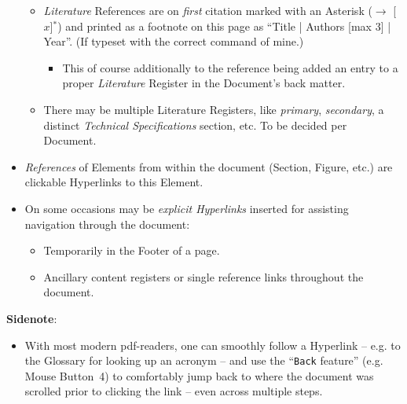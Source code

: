 \begin{itemize}
\begin{itemize}
    \item
        \textit{Literature} References are on \textit{first} citation marked with an Asterisk ($\rightarrow$ [$x$]$^\ast$) and printed as a footnote on this page as \enquote{Title | Authors [max 3] | Year}. (If typeset with the correct command of mine.)
        \begin{itemize}
        \item
            This of course additionally to the reference being added an entry to a proper \textit{Literature} Register in the Document's back matter.
        \end{itemize}
    \item
        There may be multiple Literature Registers, like \textit{primary}, \textit{secondary}, a distinct \textit{Technical Specifications} section, etc. To be decided per Document.
    \end{itemize}
\item
    \textit{References} of Elements from within the document (Section, Figure, etc.) are clickable Hyperlinks to this Element.
\item
    On some occasions may be \textit{explicit Hyperlinks} inserted for assisting navigation through the document:
    \begin{itemize}
    \item
        Temporarily in the Footer of a page.
    \item
        Ancillary content registers or single reference links throughout the document.
    \end{itemize}
\end{itemize}

\npi%
\textbf{Sidenote}:
\begin{itemize}
\item
    With most modern pdf-readers, one can smoothly follow a Hyperlink -- e.g. to the Glossary for looking up an acronym -- and use the \enquote{\texttt{Back} feature} (e.g. Mouse Button~4) to comfortably jump back to where the document was scrolled prior to clicking the link -- even across multiple steps.
\end{itemize}